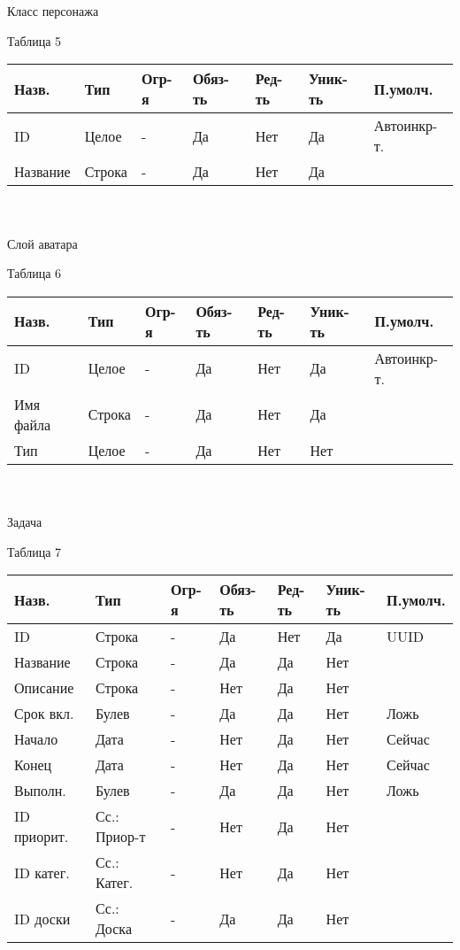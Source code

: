 \documentclass[../document.tex]{subfiles}
\begin{document}
\\\\
Класс персонажа
\begin{flushright}
  Таблица 5
\end{flushright}
\begin{tabular}{ | l | l | l | l | l | l | l | }
  \hline
  Назв.    & Тип    & Огр-я & Обяз-ть & Ред-ть & Уник-ть & П.умолч.    \\
  \hline
  ID       & Целое  & -     & Да      & Нет    & Да      & Автоинкр-т. \\
  Название & Строка & -     & Да      & Нет    & Да      &             \\
  \hline
\end{tabular}
\\\\
Слой аватара
\begin{flushright}
  Таблица 6
\end{flushright}
\begin{tabular}{ | l | l | l | l | l | l | l | }
  \hline
  Назв.     & Тип    & Огр-я & Обяз-ть & Ред-ть & Уник-ть & П.умолч.    \\
  \hline
  ID        & Целое  & -     & Да      & Нет    & Да      & Автоинкр-т. \\
  Имя файла & Строка & -     & Да      & Нет    & Да      &             \\
  Тип       & Целое  & -     & Да      & Нет    & Нет     &             \\
  \hline
\end{tabular}
\\\\
Задача
\begin{flushright}
  Таблица 7
\end{flushright}
\begin{tabular}{ | l | l | l | l | l | l | l | }
  \hline
  Назв.       & Тип          & Огр-я & Обяз-ть & Ред-ть & Уник-ть & П.умолч. \\
  \hline
  ID          & Строка       & -     & Да      & Нет    & Да      & UUID     \\
  Название    & Строка       & -     & Да      & Да     & Нет     &          \\
  Описание    & Строка       & -     & Нет     & Да     & Нет     &          \\
  Срок вкл.   & Булев        & -     & Да      & Да     & Нет     & Ложь     \\
  Начало      & Дата         & -     & Нет     & Да     & Нет     & Сейчас   \\
  Конец       & Дата         & -     & Нет     & Да     & Нет     & Сейчас   \\
  Выполн.     & Булев        & -     & Да      & Да     & Нет     & Ложь     \\
  ID приорит. & Сс.: Приор-т & -     & Нет     & Да     & Нет     &          \\
  ID катег.   & Сс.: Катег.  & -     & Нет     & Да     & Нет     &          \\
  ID доски    & Сс.: Доска   & -     & Да      & Да     & Нет     &          \\
  \hline
\end{tabular}
\end{document}

